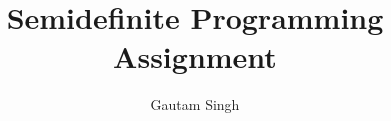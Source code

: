 \documentclass[journal,12pt,twocolumn]{IEEEtran}
\DeclareMathOperator*{\Res}{Res}
\begin{document}
\newtheorem{theorem}{Theorem}[section]
\newtheorem{problem}{Problem}
\newtheorem{proposition}{Proposition}[section]
\newtheorem{lemma}{Lemma}[section]
\newtheorem{corollary}[theorem]{Corollary}
\newtheorem{example}{Example}[section]
\newtheorem{definition}[problem]{Definition}
\newcommand{\BEQA}{\begin{eqnarray}}
\newcommand{\EEQA}{\end{eqnarray}}
\newcommand{\define}{\stackrel{\triangle}{=}}

\providecommand{\mbf}{\mathbf}
\providecommand{\pr}[1]{\ensuremath{\Pr\left(#1\right)}}
\providecommand{\tr}[1]{\ensuremath{\textrm{tr}\left(#1\right)}}
\providecommand{\qfunc}[1]{\ensuremath{Q\left(#1\right)}}
\providecommand{\sbrak}[1]{\ensuremath{{}\left[#1\right]}}
\providecommand{\lsbrak}[1]{\ensuremath{{}\left[#1\right.}}
\providecommand{\rsbrak}[1]{\ensuremath{{}\left.#1\right]}}
\providecommand{\brak}[1]{\ensuremath{\left(#1\right)}}
\providecommand{\lbrak}[1]{\ensuremath{\left(#1\right.}}
\providecommand{\rbrak}[1]{\ensuremath{\left.#1\right)}}
\providecommand{\cbrak}[1]{\ensuremath{\left\{#1\right\}}}
\providecommand{\lcbrak}[1]{\ensuremath{\left\{#1\right.}}
\providecommand{\rcbrak}[1]{\ensuremath{\left.#1\right\}}}
\theoremstyle{remark}
\newtheorem{rem}{Remark}
\newcommand{\sgn}{\mathop{\mathrm{sgn}}}
\providecommand{\abs}[1]{\left\vert#1\right\vert}
\providecommand{\res}[1]{\Res\displaylimits_{#1}} 
\providecommand{\norm}[1]{\left\lVert#1\right\rVert}
\providecommand{\mtx}[1]{\mathbf{#1}}
\providecommand{\mean}[1]{E\left[ #1 \right]}
\providecommand{\fourier}{\overset{\mathcal{F}}{ \rightleftharpoons}}
\providecommand{\system}[1]{\overset{\mathcal{#1}}{ \longleftrightarrow}}
\newcommand{\solution}{\noindent \textbf{Solution: }}
\newcommand{\cosec}{\,\text{cosec}\,}
\providecommand{\dec}[2]{\ensuremath{\overset{#1}{\underset{#2}{\gtrless}}}}
\newcommand{\myvec}[1]{\ensuremath{\begin{pmatrix}#1\end{pmatrix}}}
\newcommand{\mydet}[1]{\ensuremath{\begin{vmatrix}#1\end{vmatrix}}}
\let\vec\mathbf
\def\putbox#1#2#3{\makebox[0in][l]{\makebox[#1][l]{}\raisebox{\baselineskip}[0in][0in]{\raisebox{#2}[0in][0in]{#3}}}}
     \def\rightbox#1{\makebox[0in][r]{#1}}
     \def\centbox#1{\makebox[0in]{#1}}
     \def\topbox#1{\raisebox{-\baselineskip}[0in][0in]{#1}}
     \def\midbox#1{\raisebox{-0.5\baselineskip}[0in][0in]{#1}}

\vspace{3cm}
\title{Semidefinite Programming Assignment}
\author{Gautam Singh}
\maketitle
\bigskip
\end{document}
